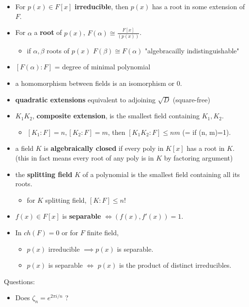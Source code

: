 \documentclass[12pt]{article}
\newcommand{\bt}[1]{\textbf{#1}} %
\begin{document}
\begin{itemize}

\item For $p(x) \in F[x]$ \bt{irreducible}, then $p(x)$ has a root in some extension of $F$.

\item For $\alpha$ a \bt{root} of $p(x)$, $F(\alpha) \cong \frac{F[x]}{(p(x))}$.

\begin{itemize}
    \item if $\alpha, \beta$ roots of $p(x)$ $F(\beta) \cong F(\alpha)$ "algebracailly indistinguishable"
\end{itemize}

\item $[F(\alpha):F] $ = degree of minimal polynomial

\item a homomorphism between fields is an isomorphism or 0.

\item \bt{quadratic extensions} equivalent to adjoining $\sqrt{D}$ (square-free)

\item $K_1K_2$, \bt{composite extension}, is the smallest field containing $K_1, K_2$.

\begin{itemize}
    \item $[K_1:F]=n, [K_2:F]=m$, then $[K_1K_2:F] \leq nm$ (= if (n, m)=1).
\end{itemize}

\item a field $K$ is \bt{algebraically closed} if every poly in $K[x]$ has a root in $K$. (this in fact means every root of any poly is in $K$ by factoring argument)

\item the \bt{splitting field} $K$ of a polynomial is the smallest field containing all its roots.
    \begin{itemize}
        \item for $K$ splitting field, $[K:F] \leq n!$
    \end{itemize}

\item $f(x) \in F[x]$ is \bt{separable} $\iff (f(x), f'(x)) = 1$.

\item In $ch(F)=0$ or for $F$ finite field, 
    \begin{itemize}
        \item $p(x)$ irreducible $\implies p(x)$ is separable.
        \item $p(x)$ is separable $\iff$ $p(x)$ is the product of distinct irreducibles.
    \end{itemize}
\end{itemize}

Questions:
\begin{itemize}
    \item Does $\zeta_n = e^{2\pi i / n}$ ?
\end{itemize}
\end{document}
